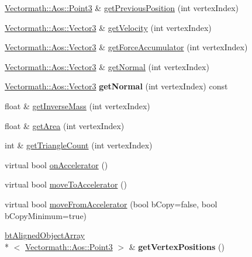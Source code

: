 \begin{DoxyCompactItemize}
\item 
\hyperlink{class_vectormath_1_1_aos_1_1_point3}{Vectormath\+::\+Aos\+::\+Point3} \& \hyperlink{classbt_soft_body_vertex_data_a123a978bf93f1ea06263b157e433ad97}{get\+Previous\+Position} (int vertex\+Index)
\item 
\hyperlink{class_vectormath_1_1_aos_1_1_vector3}{Vectormath\+::\+Aos\+::\+Vector3} \& \hyperlink{classbt_soft_body_vertex_data_ae2283fd9cc23dcaff3721fbcf26e3bad}{get\+Velocity} (int vertex\+Index)
\item 
\hyperlink{class_vectormath_1_1_aos_1_1_vector3}{Vectormath\+::\+Aos\+::\+Vector3} \& \hyperlink{classbt_soft_body_vertex_data_a34e1fdb82d6db75a4c22409632c3b369}{get\+Force\+Accumulator} (int vertex\+Index)
\item 
\hyperlink{class_vectormath_1_1_aos_1_1_vector3}{Vectormath\+::\+Aos\+::\+Vector3} \& \hyperlink{classbt_soft_body_vertex_data_a1404390d4cbbf841e1749dc1779fd104}{get\+Normal} (int vertex\+Index)
\item 
\hypertarget{classbt_soft_body_vertex_data_a63a10c656cbd0e880e1e561143d4fcc8}{\hyperlink{class_vectormath_1_1_aos_1_1_vector3}{Vectormath\+::\+Aos\+::\+Vector3} {\bfseries get\+Normal} (int vertex\+Index) const }\label{classbt_soft_body_vertex_data_a63a10c656cbd0e880e1e561143d4fcc8}

\item 
float \& \hyperlink{classbt_soft_body_vertex_data_af635ef3bb6d2b272f6b95d453bc05761}{get\+Inverse\+Mass} (int vertex\+Index)
\item 
float \& \hyperlink{classbt_soft_body_vertex_data_aed372e4aa15c1101feabec4ea7fe80a2}{get\+Area} (int vertex\+Index)
\item 
int \& \hyperlink{classbt_soft_body_vertex_data_a8c4f3283367407c593745929aaf7d639}{get\+Triangle\+Count} (int vertex\+Index)
\item 
virtual bool \hyperlink{classbt_soft_body_vertex_data_a6512d196039f6445489a093ad18f7764}{on\+Accelerator} ()
\item 
virtual bool \hyperlink{classbt_soft_body_vertex_data_a2d3f04a5b2461bf95beca6f3fc48e28b}{move\+To\+Accelerator} ()
\item 
virtual bool \hyperlink{classbt_soft_body_vertex_data_aaa8ab4065ecf47a9c3b946b67b6c9f1b}{move\+From\+Accelerator} (bool b\+Copy=false, bool b\+Copy\+Minimum=true)
\item 
\hypertarget{classbt_soft_body_vertex_data_af168e43ddea128f820eaacba02ea4302}{\hyperlink{classbt_aligned_object_array}{bt\+Aligned\+Object\+Array}\\*
$<$ \hyperlink{class_vectormath_1_1_aos_1_1_point3}{Vectormath\+::\+Aos\+::\+Point3} $>$ \& {\bfseries get\+Vertex\+Positions} ()}\label{classbt_soft_body_vertex_data_af168e43ddea128f820eaacba02ea4302}

\end{DoxyCompactItemize}
